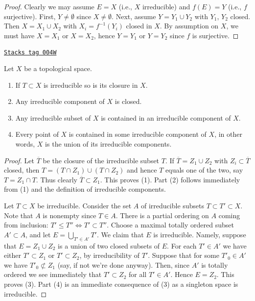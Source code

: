 \begin{proof}
Clearly we may assume $E = X$ (i.e., $X$ irreducible)
and $f(E) = Y$ (i.e., $f$ surjective). First, $Y \not = \emptyset$
since $X \not = \emptyset$. Next, assume $Y = Y_1 \cup Y_2$ with
$Y_1$, $Y_2$ closed. Then $X = X_1 \cup X_2$ with $X_i = f^{-1}(Y_i)$
closed in $X$. By assumption on $X$, we must have
$X = X_1$ or $X = X_2$, hence $Y = Y_1$ or $Y = Y_2$
since $f$ is surjective.
\end{proof}

\begin{lemma}[Irreducible]
\label{topology-lemma-irreducible}
\href{https://stacks.math.columbia.edu/tag/004W}{\texttt{Stacks tag 004W}}

Let $X$ be a topological space.
\begin{enumerate}
\item If $T \subset X$ is irreducible so is its closure in $X$.
\item Any irreducible component of $X$ is closed.
\item Any irreducible subset of $X$ is contained in an
irreducible component of $X$.
\item Every point of $X$ is contained in some irreducible component
of $X$, in other words, $X$ is the union of its irreducible components.
\end{enumerate}
\end{lemma}

\begin{proof}
Let $\overline{T}$ be the closure of the irreducible subset $T$.
If $\overline{T} = Z_1 \cup Z_2$ with $Z_i \subset \overline{T}$
closed, then $T = (T\cap Z_1) \cup (T \cap Z_2)$ and hence
$T$ equals one of the two, say $T = Z_1 \cap T$. Thus clearly
$\overline{T} \subset Z_1$. This proves (1). Part (2) follows
immediately from (1) and the definition of irreducible components.

\medskip\noindent
Let $T \subset X$ be irreducible. Consider the set $A$ of irreducible subsets
$T \subset T' \subset X$. Note that $A$ is nonempty since
$T \in A$. There is a partial ordering on $A$ coming from
inclusion: $T' \leq T'' \Leftrightarrow T' \subset T''$.
Choose a maximal totally ordered subset $A' \subset A$, and let
$E = \bigcup_{T' \in A'} T'$. We claim that $E$ is
irreducible. Namely, suppose that $E =  Z_1 \cup Z_2$ is a union
of two closed subsets of $E$. For each $T' \in A'$ we have
either $T' \subset Z_1$ or $T' \subset Z_2$, by irreducibility
of $T'$. Suppose that for some $T'_0 \in A'$ we have
$T'_0 \not\subset Z_1$ (say, if not we're done anyway).
Then, since $A'$ is totally ordered we see immediately that
$T' \subset Z_2$ for all $T' \in A'$. Hence $E = Z_2$.
This proves (3). Part (4) is an immediate consequence of (3)
as a singleton space is irreducible.
\end{proof}

